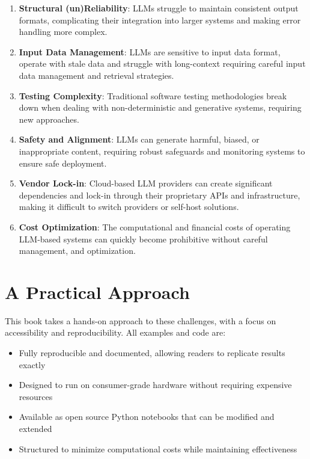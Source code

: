 \begin{enumerate}
\item \textbf{Structural (un)Reliability}: LLMs struggle to maintain consistent output formats, complicating their integration into larger systems and making error handling more complex.

\item \textbf{Input Data Management}: LLMs are sensitive to input data format, operate with stale data and struggle with long-context requiring careful input data management and retrieval strategies.

\item \textbf{Testing Complexity}: Traditional software testing methodologies break down when dealing with non-deterministic and generative systems, requiring new approaches.

\item \textbf{Safety and Alignment}: LLMs can generate harmful, biased, or inappropriate content, requiring robust safeguards and monitoring systems to ensure safe deployment.

\item \textbf{Vendor Lock-in}: Cloud-based LLM providers can create significant dependencies and lock-in through their proprietary APIs and infrastructure, making it difficult to switch providers or self-host solutions.

\item \textbf{Cost Optimization}: The computational and financial costs of operating LLM-based systems can quickly become prohibitive without careful management, and optimization.
\end{enumerate}

\section{A Practical Approach}

This book takes a hands-on approach to these challenges, with a focus on accessibility and reproducibility. 
All examples and code are:

\begin{itemize}
\item Fully reproducible and documented, allowing readers to replicate results exactly
\item Designed to run on consumer-grade hardware without requiring expensive resources
\item Available as open source Python notebooks that can be modified and extended
\item Structured to minimize computational costs while maintaining effectiveness
\end{itemize}

